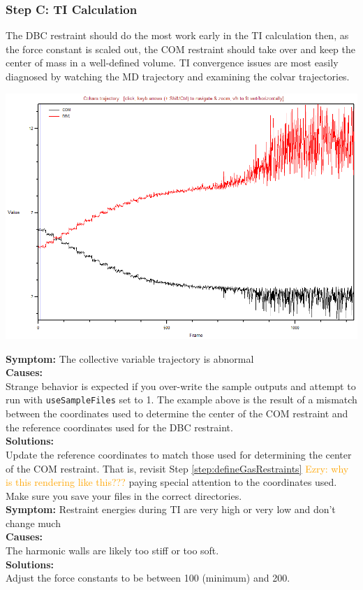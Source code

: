 \documentclass[9pt,tutorial]{Styling/livecoms}
\newcommand{\ezry}[1]{\textcolor{orange}{Ezry: #1}}
\newcommand{\textInput}[1]{
  \texttt{#1}
}
\begin{document}
\subsubsection{Step C: TI Calculation}
The DBC restraint should do the most work early in the TI calculation then, as the force constant is scaled out, the COM restraint should take over and keep the center of mass in a well-defined volume. TI convergence issues are most easily diagnosed by watching the MD trajectory and examining the colvar trajectories.

\includegraphics[width=0.9\linewidth]{Figures/CV_COM_mismatchedRefs.png}

\noindent\textbf{Symptom:} The collective variable trajectory is abnormal\\
\textbf{Causes:}\\
Strange behavior is expected if you over-write the sample outputs and attempt to run with \textInput{useSampleFiles} set to 1. The example above is the result of a mismatch between the coordinates used to determine the center of the COM restraint and the reference coordinates used for the DBC restraint.\\
\textbf{Solutions:}\\
Update the reference coordinates to match those used for determining the center of the COM restraint. That is, revisit Step \ref{step:defineGasRestraints} \ezry{why is this rendering like this???} paying special attention to the coordinates used. Make sure you save your files in the correct directories. \\

\noindent\textbf{Symptom:} Restraint energies during TI are very high or very low and don't change much\\
\textbf{Causes:}\\
The harmonic walls are likely too stiff or too soft.\\
\textbf{Solutions:}\\
Adjust the force constants to be between 100 (minimum) and 200. \\
\end{document}
